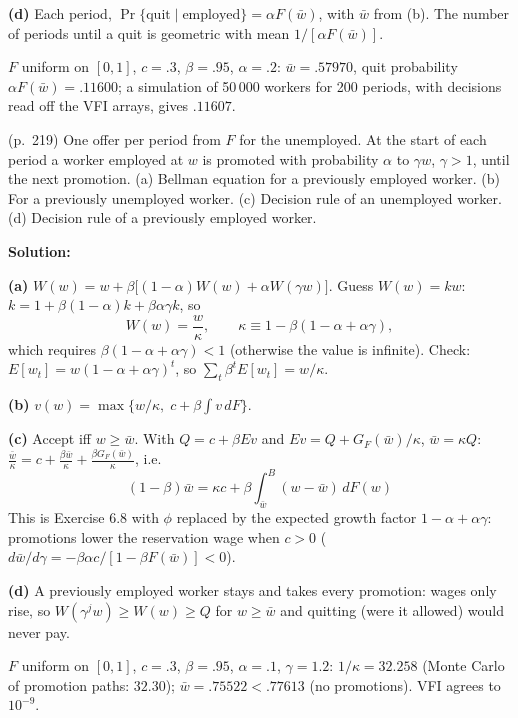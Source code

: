 \documentclass[12pt, letterpaper]{article}
\newcommand{\wb}{\bar w}
\begin{document}
\begin{tcolorbox}[evenbox,title={Exercise 6.22 \quad Quits}]
\textbf{(d)} Each period, $\Pr\{\text{quit}\mid\text{employed}\}=\alpha F(\wb)$, with $\wb$ from (b). The number of
periods until a quit is geometric with mean $1/[\alpha F(\wb)]$.

\begin{tcolorbox}[databox]
$F$ uniform on $[0,1]$, $c=.3$, $\beta=.95$, $\alpha=.2$: $\wb=.57970$, quit probability $\alpha F(\wb)=.11600$; a
simulation of 50\,000 workers for 200 periods, with decisions read off the VFI arrays, gives $.11607$.
\end{tcolorbox}
\end{tcolorbox}

\begin{tcolorbox}[oddbox,title={Exercise 6.23 \quad A Career Ladder}]
\begin{tcolorbox}[questionbox]
(p.~219) One offer per period from $F$ for the unemployed. At the start of each period a worker employed
at $w$ is promoted with probability $\alpha$ to $\gamma w$, $\gamma>1$, until the next promotion. (a) Bellman equation for
a previously employed worker. (b) For a previously unemployed worker. (c) Decision rule of an unemployed
worker. (d) Decision rule of a previously employed worker.
\end{tcolorbox}

\textbf{Solution:}

\textbf{(a)} $\boxed{W(w)=w+\beta\big[(1-\alpha)W(w)+\alpha W(\gamma w)\big]}$. Guess $W(w)=kw$:
$k=1+\beta(1-\alpha)k+\beta\alpha\gamma k$, so
\[
W(w)=\frac{w}{\kappa},\qquad \kappa\equiv1-\beta(1-\alpha+\alpha\gamma),
\]
which requires $\beta(1-\alpha+\alpha\gamma)<1$ (otherwise the value is infinite). Check: $E[w_t]=w(1-\alpha+\alpha\gamma)^t$,
so $\sum_t\beta^tE[w_t]=w/\kappa$.

\textbf{(b)} $\boxed{v(w)=\max\{w/\kappa,\;c+\beta\int v\,dF\}}$.

\textbf{(c)} Accept iff $w\ge\wb$. With $Q=c+\beta Ev$ and $Ev=Q+G_F(\wb)/\kappa$, $\wb=\kappa Q$:
$\frac{\wb}{\kappa}=c+\frac{\beta\wb}{\kappa}+\frac{\beta G_F(\wb)}{\kappa}$, i.e.
\[
\boxed{(1-\beta)\wb=\kappa c+\beta\int_{\wb}^B(w-\wb)\,dF(w)}
\]
This is Exercise 6.8 with $\phi$ replaced by the expected growth factor $1-\alpha+\alpha\gamma$: promotions lower the
reservation wage when $c>0$ ($d\wb/d\gamma=-\beta\alpha c/[1-\beta F(\wb)]<0$).

\textbf{(d)} A previously employed worker stays and takes every promotion: wages only rise, so
$W(\gamma^jw)\ge W(w)\ge Q$ for $w\ge\wb$ and quitting (were it allowed) would never pay.

\begin{tcolorbox}[databox]
$F$ uniform on $[0,1]$, $c=.3$, $\beta=.95$, $\alpha=.1$, $\gamma=1.2$: $1/\kappa=32.258$ (Monte Carlo of promotion paths: $32.30$);
$\wb=.75522<.77613$ (no promotions). VFI agrees to $10^{-9}$.
\end{tcolorbox}
\end{tcolorbox}
\end{document}
